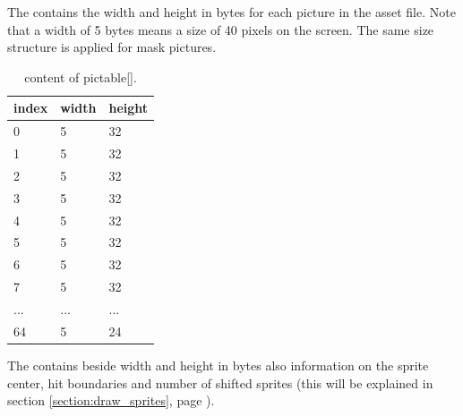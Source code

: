 \documentclass[book.tex]{subfiles}
\begin{document}
The  contains the width and height in bytes for each picture in the asset file. Note that a width of 5 bytes means a size of 40 pixels on the screen. The same size structure is applied for mask pictures.\\

  \begin{table}[H]
  \begin{tabularx}{0.8\textwidth}[c]{XXX}
  \hline
  \textbf{index} & \textbf{width} & \textbf{height}   \\ \hline
  0             & 5          & 32    \\
  1             & 5          & 32    \\
  2             & 5          & 32    \\
  3             & 5          & 32    \\
  4             & 5          & 32    \\
  5             & 5          & 32    \\
  6             & 5          & 32    \\
  7             & 5          & 32    \\
  ...             & ...          & ...    \\
  64             & 5          & 24    \\
  \end{tabularx}
  \caption{content of pictable[].}
  \end{table}



The  contains beside width and height in bytes also information on the sprite center, hit boundaries and number of shifted sprites (this will be explained in section \ref{section:draw_sprites}, page \pageref{section:draw_sprites}). \\
\end{document}
